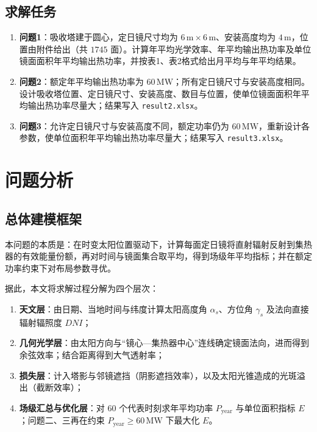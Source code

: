 \documentclass[withoutpreface,bwprint]{cumcmthesis}
\begin{document}
\subsection{求解任务}
\begin{enumerate}[leftmargin=2em]
  \item \textbf{问题1}：吸收塔建于圆心，定日镜尺寸均为 $6\,\mathrm{m}\times6\,\mathrm{m}$、安装高度均为 $4\,\mathrm{m}$，位置由附件给出（共 $1745$ 面）。计算年平均光学效率、年平均输出热功率及单位镜面面积年平均输出热功率，并按表1、表2格式给出月平均与年平均结果。
  \item \textbf{问题2}：额定年平均输出热功率为 $60\,\mathrm{MW}$；所有定日镜尺寸与安装高度相同。设计吸收塔位置、定日镜尺寸、安装高度、数目与位置，使单位镜面面积年平均输出热功率尽量大；结果写入 \texttt{result2.xlsx}。
  \item \textbf{问题3}：允许定日镜尺寸与安装高度不同，额定功率仍为 $60\,\mathrm{MW}$，重新设计各参数，使单位面积年平均输出热功率尽量大；结果写入 \texttt{result3.xlsx}。
\end{enumerate}

\section{问题分析}

\subsection{总体建模框架}
本问题的本质是：在时变太阳位置驱动下，计算每面定日镜将直射辐射反射到集热器的有效能量份额，再对时间与镜面集合取平均，得到场级年平均指标；并在额定功率约束下对布局参数寻优。

据此，本文将求解过程分解为四个层次：
\begin{enumerate}[leftmargin=2em]
  \item \textbf{天文层}：由日期、当地时间与纬度计算太阳高度角 $\alpha_s$、方位角 $\gamma_s$ 及法向直接辐射辐照度 $DNI$；
  \item \textbf{几何光学层}：由太阳方向与“镜心—集热器中心”连线确定镜面法向，进而得到余弦效率；结合距离得到大气透射率；
  \item \textbf{损失层}：计入塔影与邻镜遮挡（阴影遮挡效率），以及太阳光锥造成的光斑溢出（截断效率）；
  \item \textbf{场级汇总与优化层}：对 $60$ 个代表时刻求年平均功率 $P_{\mathrm{year}}$ 与单位面积指标 $E$；问题二、三再在约束 $P_{\mathrm{year}}\ge60\,\mathrm{MW}$ 下最大化 $E$。
\end{enumerate}
\end{document}
